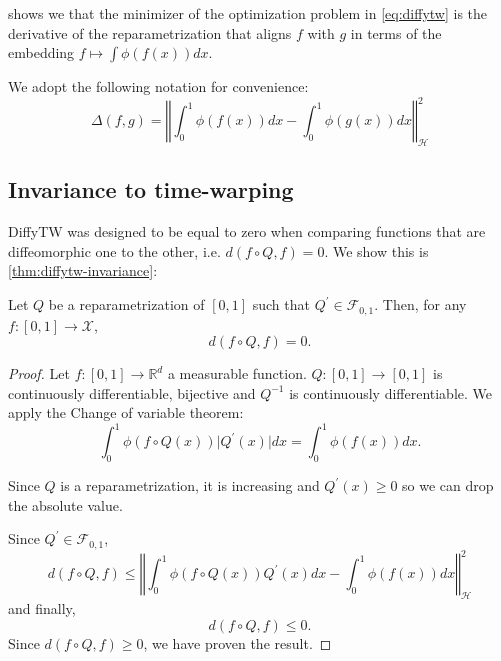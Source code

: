 \noindent {} shows we that the minimizer of the optimization problem in \cref{eq:diffytw} is the derivative of the reparametrization that aligns $f$ with $g$ in terms of the embedding $f \mapsto \int \phi(f(x))dx$.

We adopt the following notation for convenience:
\begin{equation}\label{def:diffytw-delta}
\Delta(f , g) = \left\Vert \int_0^1 \phi(f(x))dx - \int_0^1\phi(g(x))dx\right\Vert^2_\mathcal H
\end{equation}


\subsection{Invariance to time-warping}
DiffyTW was designed to be equal to zero when comparing functions that are diffeomorphic one to the other, i.e. $d(f\circ Q, f)=0$. We show this is \cref{thm:diffytw-invariance}:


\begin{theorem}\label{thm:diffytw-invariance}
Let $Q$ be a reparametrization of $[0,1]$ such that $Q^\prime \in \mathcal F_{0, 1}$. Then, for any $f: [0,1] \to \mathcal X$,
\begin{equation}
    d(f\circ Q, f) = 0.
\end{equation}
\end{theorem}

\begin{proof}
Let $f: [0,1] \to\mathbb R^d$ a measurable function. $Q:[0,1] \to [0,1]$ is continuously differentiable, bijective and $Q^{-1}$ is continuously differentiable. We apply the Change of variable theorem:
\begin{equation}
\int_0^1 \phi(f\circ Q(x))\vert Q^\prime(x)\vert dx = \int_0^1 \phi(f(x))dx.
\end{equation}

Since $Q$ is a reparametrization, it is increasing and $Q^\prime(x) \geq 0$ so we can drop the absolute value.

Since $Q^\prime \in \mathcal F_{0,1}$,
\begin{equation}
    d(f\circ Q, f) \leq \left \Vert \int_0^1 \phi(f\circ Q(x))Q^\prime(x)dx - \int_0^1 \phi(f(x))dx\right\Vert_\mathcal H^2
\end{equation}
and finally,
\begin{equation}
    d(f\circ Q, f) \leq 0.
\end{equation}
Since $d(f\circ Q, f) \geq 0$, we have proven the result.
\end{proof}


